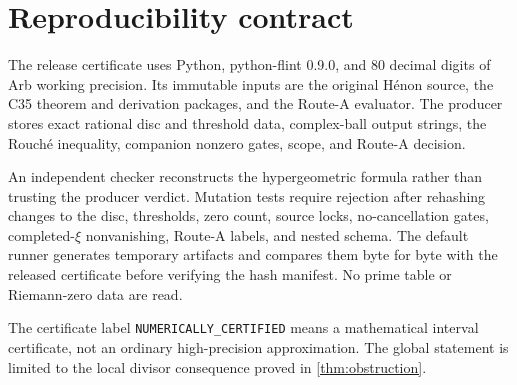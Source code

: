 \section{Reproducibility contract}

The release certificate uses Python, python-flint 0.9.0, and 80 decimal
digits of Arb working precision. Its immutable inputs are the original
H\'enon source, the C35 theorem and derivation packages, and the Route-A
evaluator. The producer stores exact rational disc and threshold data,
complex-ball output strings, the Rouch\'e inequality, companion nonzero
gates, scope, and Route-A decision.

An independent checker reconstructs the hypergeometric formula rather than
trusting the producer verdict. Mutation tests require rejection after
rehashing changes to the disc, thresholds, zero count, source locks,
no-cancellation gates, completed-\(\xi\) nonvanishing, Route-A labels, and
nested schema. The default runner
generates temporary artifacts and compares them byte for byte with the
released certificate before verifying the hash manifest. No prime table or
Riemann-zero data are read.

The certificate label \texttt{NUMERICALLY\_CERTIFIED} means a mathematical
interval certificate, not an ordinary high-precision approximation. The
global statement is limited to the local divisor consequence proved in
\cref{thm:obstruction}.
